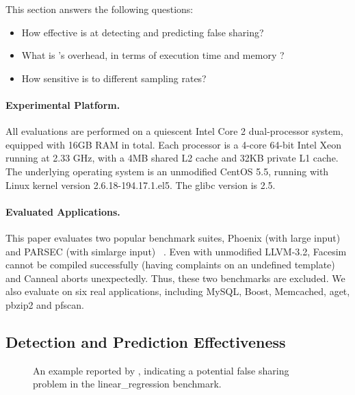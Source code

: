 


\label{sec:evaluation}

This section answers the following questions:
\begin{itemize}
\item
  How effective is \Predator{} at detecting and predicting false sharing?

\item
  What is \Predator{}'s overhead, in terms of execution time and memory ?

\item
  How sensitive is \Predator{} to different sampling rates?
 
\end{itemize}

\paragraph{Experimental Platform.} All evaluations are performed on a quiescent Intel Core 2 dual-processor system,  equipped with 16GB RAM in total. Each processor is a 4-core 64-bit Intel Xeon running at 2.33 GHz, with a 4MB shared L2 cache and 32KB private L1 cache. The underlying operating system is an unmodified CentOS 5.5, running with Linux kernel version 2.6.18-194.17.1.el5. The glibc version is 2.5. 

\paragraph{Evaluated Applications.}
This paper evaluates two popular benchmark suites,
Phoenix (with large input) ~\cite{phoenix-hpca} and PARSEC (with simlarge input) ~\cite{parsec}. Even with unmodified LLVM-3.2, Facesim cannot be compiled successfully (having complaints on an undefined template) and Canneal aborts unexpectedly. Thus, these two benchmarks are excluded.
We also evaluate \Predator{} on six real applications, including MySQL, Boost, Memcached, aget, pbzip2 and pfscan.



\subsection{Detection and Prediction Effectiveness}
\label{sec:predatoreffective}

\begin{figure}[htb]
{\centering
\tiny
\subfigure{}
\caption{An example reported by \Predator{}, indicating a potential false sharing problem in the linear\_regression benchmark.
\label{fig:lrreport}}
}
\end{figure}

